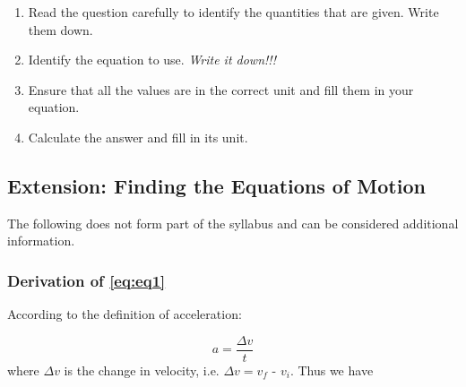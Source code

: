      \label{m38796*id76133}\begin{enumerate}[noitemsep, label=\textbf{\arabic*}. ] 
            \label{m38796*uid130}\item Read the question carefully to identify the quantities that are given. Write them down.
\label{m38796*uid131}\item Identify the equation to use. \textsl{Write it down!!!}\label{m38796*uid132}\item Ensure that all the values are in the correct unit and fill them in your equation.
\label{m38796*uid133}\item Calculate the answer and fill in its unit.
\end{enumerate}
	\par
      \label{m38796*uid134}
            \subsection*{Extension: Finding the Equations of Motion}
            \nopagebreak
        \label{m38796*id76225}The following does not form part of the syllabus and can be considered additional information.\par 
        \label{m38796*uid135}
            \subsubsection*{Derivation of \ref{eq:eq1}}
            \nopagebreak
          \label{m38796*id76242}According to the definition of acceleration:\par 
          \label{m38796*id76246}\nopagebreak\noindent{}
            
    \begin{equation*}
    a=\frac{\Delta v}{t}
      \end{equation*}
          \label{m38796*id76270}where $\Delta v$ is the change in velocity, i.e. $\Delta v={v}_{f}$ - ${v}_{i}$.
Thus we have\par 
          \label{m38796*id76324}\nopagebreak\noindent{}
            
